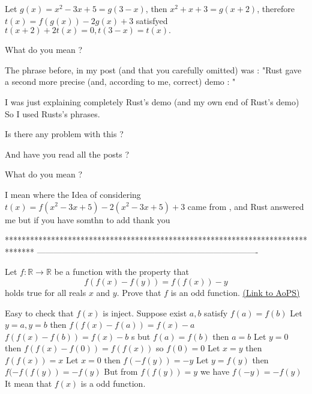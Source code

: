 \begin{mysolution}
	Let $ g(x)=x^2-3x+5=g(3-x)$, then $ x^2+x+3=g(x+2)$, therefore $ t(x)=f(g(x))-2g(x)+3$ satisfyed
$ t(x+2)+2t(x)=0,t(3-x)=t(x).$
\end{mysolution}



\begin{mysolution}


What do you mean ?

The phrase before, in my post (and that you carefully omitted) was :
"Rust gave a second more precise (and, according to me, correct) demo : "

I was just explaining completely Rust's demo (and my own end of Rust's demo)
So I used Rusts's phrases.

Is there any problem with this ?

And have you read all the posts ?
\end{mysolution}



\begin{mysolution}
	\begin{tcolorbox}
What do you mean ?
\end{tcolorbox}

I mean where the Idea of considering $ t(x) = f(x^2 - 3x + 5) - 2(x^2 - 3x + 5) + 3$ came from , and Rust answered me  but if you have somthn to add thank you  
\end{mysolution}
*******************************************************************************
-------------------------------------------------------------------------------

\begin{problem}
	Let $f: \mathbb R \to \mathbb R$ be a function with the property that
\[f(f(x)-f(y)) = f(f(x)) - y\]
holds true for all reals $x$ and $y$. Prove that $ f$ is an odd function.
	\flushright \href{https://artofproblemsolving.com/community/c6h176051}{(Link to AoPS)}
\end{problem}



\begin{mysolution}
	Easy to check that $ f(x)$ is inject.
Suppose exist $ a,b$ satisfy $ f(a)=f(b)$
Let $ y=a,y=b$ then 
$ f(f(x)-f(a))=f(x)-a$
$ f(f(x)-f(b))=f(x)-b$ s
but $ f(a)=f(b)$ then $ a=b$
Let $ y=0$ then
$ f(f(x)-f(0))=f(f(x))$ so $ f(0)=0$
Let $ x=y$ then
$ f(f(x))=x$
Let $ x=0$ then
$ f(-f(y))=-y$
Let $ y=f(y)$ then
$ f(-f(f(y))=-f(y)$ 
But from $ f(f(y))=y$ we have 
$ f(-y)=-f(y)$
It mean that $ f(x)$ is a odd function.
\end{mysolution}



